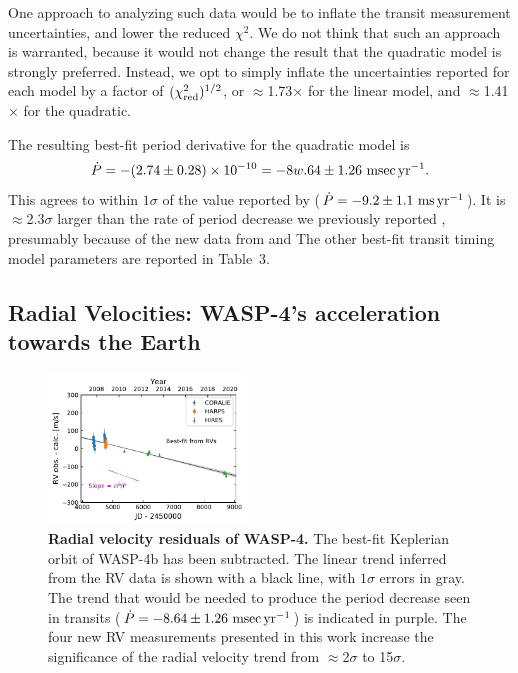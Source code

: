 \documentclass[12pt,twocolumn,tighten]{aastex62}
\begin{document}
One approach to analyzing such data would be to inflate the transit
measurement uncertainties, and lower the reduced $\chi^2$.  We do not
think that such an approach is warranted, because it would not change
the result that the quadratic model is strongly preferred.  Instead,
we opt to simply inflate the uncertainties reported for each model by
a factor of $(\chi^2_{\rm red})^{1/2}$, or $\approx$1.73$\times$ for the
linear model, and $\approx$1.41$\times$ for the quadratic.

The resulting best-fit period derivative for the quadratic model is 
\begin{equation}
\dot{P}
  = - (2.74 \pm 0.28)\times 10^{-10}
  = - 8w.64 \pm 1.26~{\rm msec}\,{\rm yr}^{-1}.
  \label{eq:dP_dt_obs}
\end{equation}
This agrees to within $1\sigma$ of the value reported by
\citet{southworth_transit_2019} ($\dot{P} = - 9.2 \pm 1.1~{\rm
ms}\,{\rm yr}^{-1}$).  It is $\approx$2.3$\sigma$ larger than the rate
of period decrease we previously reported , presumably because of the
new data from \citeauthor{southworth_transit_2019} and
\citeauthor{baluev_2019}  The other best-fit transit timing model
parameters are reported in Table~3.



\subsection{Radial Velocities: WASP-4's acceleration towards the Earth}

\begin{figure}[t]
	\begin{center}
		\leavevmode
		\includegraphics[width=0.47\textwidth]{f2.pdf}
	\end{center}
	\vspace{-0.7cm}
	\caption{
    {\bf Radial velocity residuals of WASP-4.} The best-fit
    Keplerian orbit of WASP-4b has been subtracted.  The linear trend
    inferred from the RV data is shown with a black line, with
    $1\sigma$ errors in gray.  The trend that would be needed to
    produce the period decrease seen in transits ($\dot{P}= - 8.64 \pm
    1.26~{\rm msec}\,{\rm yr}^{-1}$) is indicated in purple.  The four
    new RV measurements presented in this work increase the
    significance of the radial velocity trend from $\approx$2$\sigma$
    to 15$\sigma$.
	\label{fig:rvs}
  \vspace{-0.3cm}
	}
\end{figure}
\end{document}
